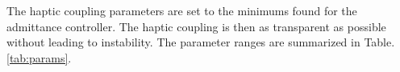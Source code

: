 \documentclass[12pt]{report}
\begin{document}

	
	The haptic coupling parameters are set to the minimums found for the admittance controller. The haptic coupling is then as transparent as possible without leading to instability. The parameter ranges are summarized in Table. \ref{tab:params}. 
	
		
\end{document}

